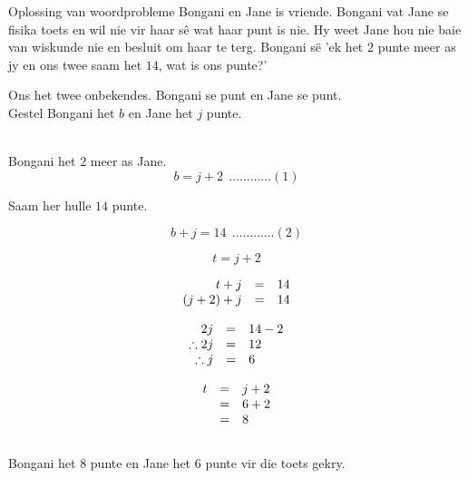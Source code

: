 \begin{wex}{Oplossing van woordprobleme}{
Bongani en Jane is vriende. Bongani vat Jane se fisika toets en wil nie vir haar s\^e wat haar punt is nie. Hy weet Jane hou nie baie van wiskunde nie en besluit om haar te terg. Bongani s\"e 
'ek het $2$ punte meer as jy en ons twee saam het $14$, wat is ons punte?'}
{
Ons het twee onbekendes. Bongani se punt en Jane se punt.
\\Gestel Bongani het $b$ en Jane het $j$ punte. 

\\Bongani het $2$ meer as Jane.
\begin{equation*}
  b=j+2 ~~\ldots \ldots \ldots \ldots (1)
\end{equation*}

Saam her hulle $14$ punte.

\begin{equation*}
  b+j=14 ~~\ldots \ldots \ldots \ldots (2)
\end{equation*}

\begin{equation*}
t=j+2
\end{equation*}

\begin{equation*}
    \begin{array}{ccc}\hfill t+j& =& 14\hfill \\
	\hfill (j+2)+j& =& 14\hfill \\

    \end{array}
\end{equation*}

\begin{equation*}
    \begin{array}{ccl}\hfill 2j& =& 14 - 2\hfill \\
	\hfill \therefore 2j& =& 12\hfill \\
\hfill \therefore j &=& 6 \hfill

    \end{array}
\end{equation*}

\begin{equation*}
\begin{array}{ccl}\hfill t& =& j+2\hfill \\ & =& 6+2\hfill \\ & =& 8\hfill \end{array}
\end{equation*}
\\
Bongani het $8$ punte en Jane het  $6$ punte vir die toets gekry.\\
}
\end{wex}

